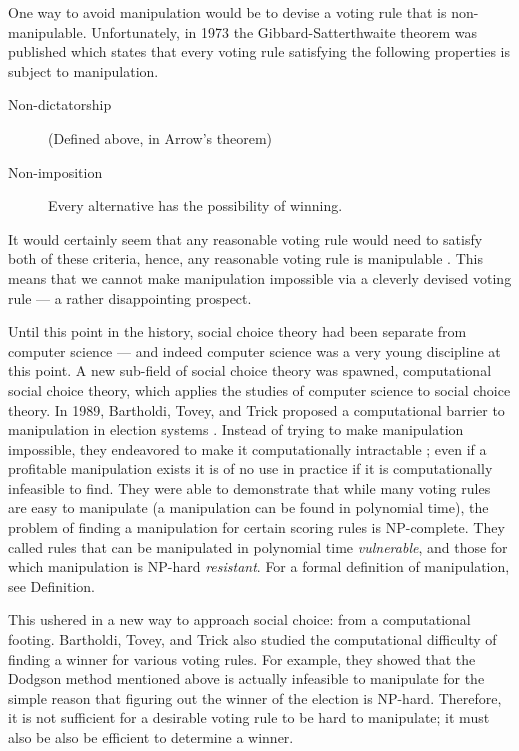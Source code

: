 	One way to avoid manipulation would be to devise a voting rule that is non-manipulable. Unfortunately, in 1973 the Gibbard-Satterthwaite theorem was published which states that every voting rule satisfying the following properties is subject to manipulation.
	\begin{description}
		\item[Non-dictatorship] (Defined above, in Arrow's theorem)
		\item[Non-imposition] Every alternative has the possibility of winning.
	\end{description}
	It would certainly seem that any reasonable voting rule would need to satisfy both of these criteria, hence, any reasonable voting rule is manipulable \cite{gibbard1973manipulation, satterthwaite1975strategy, duggan2000strategic}. This means that we cannot make manipulation impossible via a cleverly devised voting rule --- a rather disappointing prospect.


	Until this point in the history, social choice theory had been separate from computer science --- and indeed computer science was a very young discipline at this point. A new sub-field of social choice theory was spawned, computational social choice theory, which applies the studies of computer science to social choice theory. In 1989, Bartholdi, Tovey, and Trick proposed a computational barrier to manipulation in election systems \cite{bartholdi1989computational}. Instead of trying to make manipulation impossible, they endeavored to make it computationally intractable \cite{chevaleyre2007short}; even if a profitable manipulation exists it is of no use in practice if it is computationally infeasible to find. They were able to demonstrate that while many voting rules are easy to manipulate (a manipulation can be found in polynomial time), the problem of finding a manipulation for certain scoring rules is NP-complete. They called rules that can be manipulated in polynomial time \emph{vulnerable}, and those for which manipulation is NP-hard \emph{resistant}. For a formal definition of manipulation, see Definition.

	This ushered in a new way to approach social choice: from a computational footing. Bartholdi, Tovey, and Trick also studied the computational difficulty of finding a winner for various voting rules. For example, they showed that the Dodgson method mentioned above \cite{dodgson1876method} is actually infeasible to manipulate for the simple reason that figuring out the winner of the election is NP-hard. Therefore, it is not sufficient for a desirable voting rule to be hard to manipulate; it must also be also be efficient to determine a winner.

